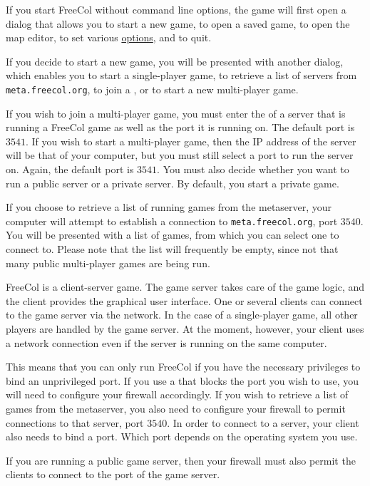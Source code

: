 \documentclass[12pt]{article}
\begin{document}
If you start FreeCol without command line options, the game will first
open a dialog that allows you to start a new game, to open a saved
game, to open the map editor, to set various \hyperlink{Client
  options}{options}, and to quit.

If you decide to start a new game, you will be presented with another
dialog, which enables you to start a single-player game, to retrieve a
list of servers from \verb$meta.freecol.org$,
to join a , or to start a new multi-player
game.

If you wish to join a multi-player game, you must enter the
 of a server that is running a FreeCol game as
well as the port it is running on. The default port is
$3541$. If you wish to start a multi-player game,
then the IP address of the server will be that of your computer, but
you must still select a port to run the server on. Again, the default
port is $3541$. You must also decide whether you want to run a public
server or a private server. By default, you start a private game.

If you choose to retrieve a list of running games from the metaserver,
your computer will attempt to establish a connection to
\verb$meta.freecol.org$, port $3540$. You will be
presented with a list of games, from which you can select one to
connect to. Please note that the list will frequently be empty, since
not that many public multi-player games are being run.

FreeCol is a client-server game. The game server takes care of the
game logic, and the client provides the graphical user interface. One
or several clients can connect to the game server via the network. In
the case of a single-player game, all other players are handled by the
game server. At the moment, however, your client uses a network
connection even if the server is running on the same computer.

This means that you can only run FreeCol if you have the necessary
privileges to bind an unprivileged port. If you use a
 that blocks the port you wish to use, you
will need to configure your firewall accordingly. If you wish to
retrieve a list of games from the metaserver, you also need to
configure your firewall to permit connections to that server, port
$3540$. In order to connect to a server, your client also needs to
bind a port. Which port depends on the operating system you use.

If you are running a public game server, then your firewall must also
permit the clients to connect to the port of the game server.
\end{document}
